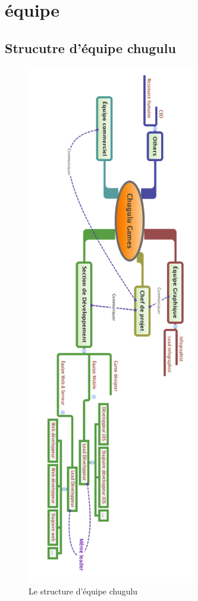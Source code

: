 \section{équipe} %
\label{sec:Équipe}


\subsection{Strucutre d'équipe chugulu} %
\label{sub:strucutre_d_équipe_chugulu}


\begin{figure}[htbp]
	\centering
		\includegraphics[height=9in]{XMinds/EquipeChuguluGames.png}
	\caption{Le structure d'équipe chugulu}
	\label{fig:XMinds_EquipeChuguluGames}
\end{figure}



